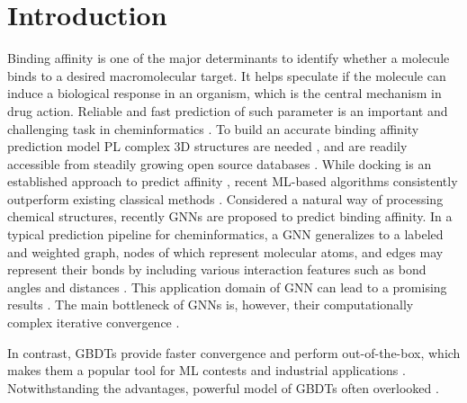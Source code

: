 \documentclass[nohyperref]{article}
\theoremstyle{plain}
\theoremstyle{definition}
\theoremstyle{remark}
\begin{document}
\section{Introduction}
Binding affinity is one of the major determinants to identify whether a molecule binds to a desired macromolecular target. It helps speculate if the molecule can induce a biological response in an organism, which is the central mechanism in drug action. Reliable and fast prediction of such parameter is an important and challenging task in cheminformatics \cite{shunzhou2020}. To build an accurate binding affinity prediction model PL complex 3D structures are needed \cite{jongtae2021}, and are readily accessible from steadily growing open source databases \cite{alphafold2021}. While docking is an established approach to predict affinity \cite{kitchen2004}, recent ML-based algorithms consistently outperform existing classical methods \cite{meli2021}. Considered a natural way of processing chemical structures, recently GNNs are proposed to predict binding affinity. In a typical prediction pipeline for cheminformatics, a GNN generalizes to a labeled and weighted graph, nodes of which represent molecular atoms, and edges may represent their bonds by including various interaction features such as bond angles and distances \cite{jones2021, jongtae2021}. This application domain of GNN can lead to a promising results \cite{Kearnes2016}. The main bottleneck of GNNs is, however, their computationally complex iterative convergence \cite{gupta2020hybrid, tiezzi2020lagrangian}. 

In contrast, GBDTs provide faster convergence and perform out-of-the-box, which makes them a popular tool for ML contests and industrial applications \cite{ivanov2021, Gorishniy2021}. Notwithstanding the advantages, powerful model of GBDTs often overlooked \cite{50030}.
\end{document}
